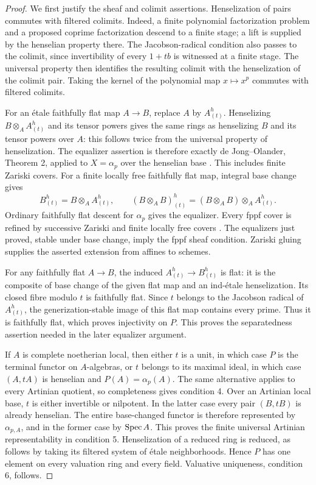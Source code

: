 \begin{proof}
We first justify the sheaf and colimit assertions. Henselization of
pairs commutes with filtered colimits. Indeed, a finite polynomial
factorization problem and a proposed coprime factorization descend
to a finite stage; a lift is supplied by the henselian property
there. The Jacobson-radical condition also passes to the colimit,
since invertibility of every $1+tb$ is witnessed at a finite stage.
The universal property then identifies the resulting colimit with
the henselization of the colimit pair. Taking the kernel of the
polynomial map $x\mapsto x^p$ commutes with filtered colimits.

For an \'etale faithfully flat map $A\to B$, replace $A$ by
$A^h_{(t)}$. Henselizing $B\otimes_A A^h_{(t)}$ and its tensor
powers gives the same rings as henselizing $B$ and its tensor
powers over $A$: this follows twice from the universal property
of henselization. The equalizer assertion is therefore exactly
de Jong--Olander, Theorem 2, applied to $X=\alpha_p$ over the
henselian base \cite{deJongOlanderHenselian}. This includes finite
Zariski covers. For a finite locally free faithfully flat map,
integral base change gives
\[
 B^h_{(t)}=B\otimes_A A^h_{(t)},\qquad
 (B\otimes_A B)^h_{(t)}
   =(B\otimes_A B)\otimes_A A^h_{(t)}.
\]
Ordinary faithfully flat descent for $\alpha_p$ gives the
equalizer. Every fppf cover is refined by successive Zariski and
finite locally free covers \cite[Lemma 37.48.2]{StacksFppfRefinement}.
The equalizers just proved, stable under base change, imply the
fppf sheaf condition. Zariski gluing supplies the asserted extension
from affines to schemes.

For any faithfully flat $A\to B$, the induced
$A^h_{(t)}\to B^h_{(t)}$ is flat: it is the composite of base
change of the given flat map and an ind-\'etale henselization.
Its closed fibre modulo $t$ is faithfully flat. Since $t$ belongs
to the Jacobson radical of $A^h_{(t)}$, the generization-stable
image of this flat map contains every prime. Thus it is faithfully
flat, which proves injectivity on $P$. This proves the separatedness assertion needed in the later
equalizer argument.

If $A$ is complete noetherian local, then either $t$ is a unit,
in which case $P$ is the terminal functor on $A$-algebras, or
$t$ belongs to its maximal ideal, in which case $(A,tA)$ is
henselian and $P(A)=\alpha_p(A)$. The same alternative applies
to every Artinian quotient, so completeness gives condition 4.
Over an Artinian local base, $t$ is either invertible or nilpotent.
In the latter case every pair $(B,tB)$ is already henselian.
The entire base-changed functor is therefore represented by
$\alpha_{p,A}$, and in the former case by $\operatorname{Spec} A$. This proves
the finite universal Artinian representability in condition 5.
Henselization of a reduced ring is reduced, as follows by taking
its filtered system of \'etale neighborhoods. Hence $P$ has one
element on every valuation ring and every field. Valuative
uniqueness, condition 6, follows.


\end{proof}
